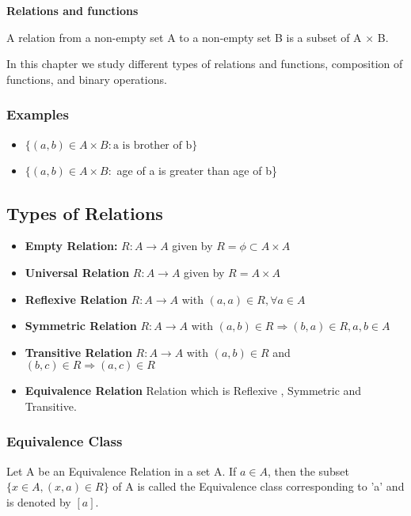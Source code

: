 \documentclass[11pt]{article}
\begin{document}
\begin{center}
    {\LARGE \textbf{Relations and functions} }
\end{center}

\begin{multicols}{2}

    A relation from a non-empty set A to a non-empty set B is a subset of A × B.
    
    In this chapter we study different types of relations and functions, composition of functions, and binary operations.
    \subsubsection*{Examples}
    \begin{itemize}
        \item $\{(a,b) \in A \times B: \text{a is brother of b}\}$
		\item $\{(a,b) \in A \times B:$ age of a is greater than age of b\}
    \end{itemize}

    \subsection*{Types of Relations }
    \begin{itemize}
        \item \textbf{Empty Relation:} $R:A \rightarrow A$ given by $R=\phi \subset A \times A$
        \item \textbf{Universal Relation} $R:A \rightarrow A$ given by $R=A \times A$
        \item \textbf{Reflexive Relation} $R:A \rightarrow A$ with $(a,a) \in R, \forall a \in A$
        \item \textbf{Symmetric Relation} $R:A \rightarrow A$ with $(a,b) \in R \Rightarrow (b,a) \in R, a,b \in A$
        \item \textbf{Transitive Relation} $R:A \rightarrow A$ with $(a,b) \in R $ and $(b,c) \in R \Rightarrow (a,c) \in R$
        \item \textbf{Equivalence Relation} Relation which is Reflexive , Symmetric and Transitive.
    \end{itemize}
    \subsubsection*{Equivalence Class}
    Let A be an Equivalence Relation in a set A. If $a \in A$, then the subset $\{x \in A ,(x,a) \in R \}$ of A is called the Equivalence class corresponding to 'a' and is denoted by $[a]$.


\end{multicols}
\end{document}
